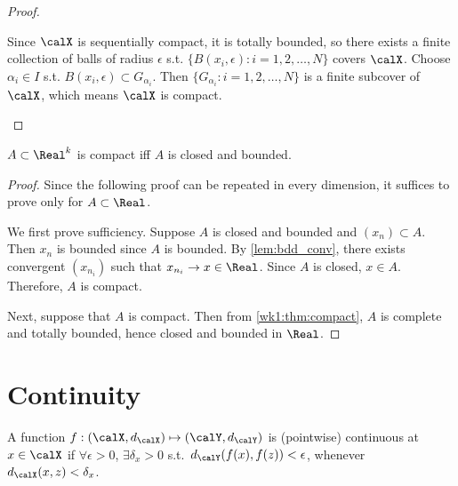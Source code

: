 \documentclass[../aipt.tex]{subfiles}
\begin{document}
\begin{proof}
\begin{enumerate}[1)]
Since $\calX$ is sequentially compact, it is totally bounded, so there exists a finite collection of balls of radius $\epsilon$ s.t. $\{B(x_i,\epsilon):i=1,2,\ldots,N\}$ covers $\calX$. Choose $\alpha_i \in I$ s.t. $B(x_i,\epsilon)\subset G_{\alpha_i}$. Then $\{G_{\alpha_i}:i=1,2,\ldots,N\}$ is a finite subcover of $\calX$, which means $\calX$ is compact.
\end{enumerate}



\end{proof}

\begin{Theorem}\label{Theorem:Heine-Borel} 
$A \subset \Real^k$ is compact iff $A$ is closed and bounded.
\end{Theorem}

\begin{proof} 
Since the following proof can be repeated in every dimension, it suffices to prove only for $A \subset \Real$.

We first prove sufficiency. Suppose $A$ is closed and bounded and $(x_n)\subset A$. Then $x_n$ is bounded since $A$ is bounded. By \cref{lem:bdd_conv}, there exists convergent $(x_{n_i})$ such that $x_{n_i}\to x\in\Real$. Since $A$ is closed, $x \in A$. Therefore, $A$ is compact.

Next, suppose that $A$ is compact. Then from \cref{wk1:thm:compact}, $A$ is complete and totally bounded, hence closed and bounded in $\Real$.

\end{proof}


\section{Continuity}

\begin{Definition}
A function $f: (\calX, d_{\calX}) \mapsto (\calY, d_{\calY})$ is (pointwise) continuous at $x \in \calX$ if $\forall \epsilon>0$, $\exists \delta_x>0$ s.t.\ $d_{\calY}(f(x),f(z))< \epsilon$, whenever $d_{\calX}(x,z)<\delta_x$. 
\end{Definition}
\end{document}
